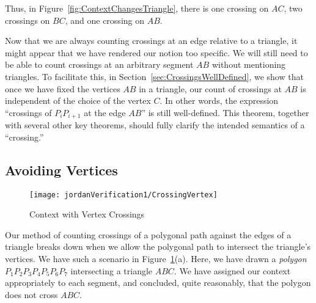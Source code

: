 Thus, in Figure~\ref{fig:ContextChangesTriangle}, there is one crossing on $AC$, two crossings on $BC$, and one crossing on $AB.$

Now that we are always counting crossings at an edge relative to a triangle, it might appear that we have rendered our notion too specific. We will still need to be able to count crossings at an arbitrary segment $AB$ without mentioning triangles. To facilitate this, in Section~\ref{sec:CrossingsWellDefined}, we show that once we have fixed the vertices $AB$ in a triangle, our count of crossings at $AB$ is independent of the choice of the vertex $C$. In other words, the expression ``crossings of $P_iP_{i+1}$ at the edge $AB$'' is still well-defined. This theorem, together with several other key theorems, should fully clarify the intended semantics of a ``crossing.''

\subsection{Avoiding Vertices}\label{sec:EdgeCases}

\begin{figure}
\centering\texttt{[image: jordanVerification1/CrossingVertex]}
\caption{Context with Vertex Crossings}
\label{fig:CrossingVertex}
\end{figure}

Our method of counting crossings of a polygonal path against the edges of a triangle breaks down when we allow the polygonal path to intersect the triangle's vertices. We have such a scenario in Figure~\ref{fig:CrossingVertex}(a). Here, we have drawn a \emph{polygon} $P_1P_2P_3P_4P_5P_6P_7$ intersecting a triangle $ABC$. We have assigned our context appropriately to each segment, and concluded, quite reasonably, that the polygon does not cross $ABC$. 

